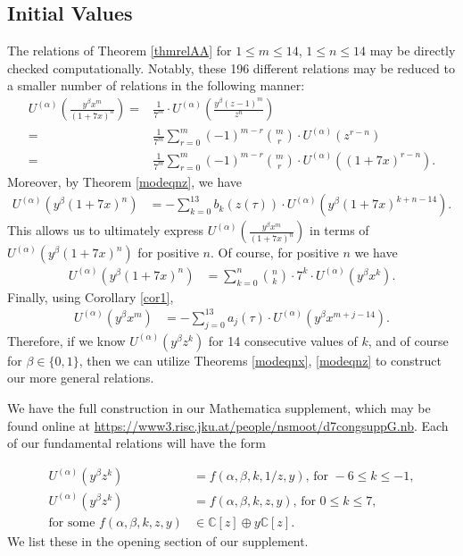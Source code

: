 \documentclass[reqno]{amsart}
\theoremstyle{definition}
\theoremstyle{remark}
\numberwithin{equation}{section}
\begin{document}
\subsection{Initial Values}\label{sectioninitialetc}

The relations of Theorem \ref{thmrelAA} for $1\le m\le 14$, $1\le n\le 14$ may be directly checked computationally.  Notably, these 196 different relations may be reduced to a smaller number of relations in the following manner:
\begin{align*}
U^{(\alpha)}\left( \frac{y^{\beta}x^{m}}{(1+7x)^{n}} \right) =& \frac{1}{7^m}\cdot U^{(\alpha)}\left( \frac{y^{\beta}(z-1)^{m}}{z^{n}} \right)\\
=& \frac{1}{7^m}\sum_{r=0}^{m}(-1)^{m-r}{{m}\choose{r}}\cdot U^{(\alpha)}\left( z^{r-n} \right)\\
=& \frac{1}{7^m}\sum_{r=0}^{m}(-1)^{m-r}{{m}\choose{r}}\cdot U^{(\alpha)}\left( (1+7x)^{r-n} \right).
\end{align*}  Moreover, by Theorem \ref{modeqnz}, we have
\begin{align*}
U^{(\alpha)}\left( y^{\beta}(1+7x)^n \right) &= -\sum_{k=0}^{13} b_k(z(\tau))\cdot U^{(\alpha)}\left( y^{\beta}(1+7x)^{k+n-14} \right).
\end{align*}  This allows us to ultimately express $U^{(\alpha)}\left( \frac{y^{\beta}x^{m}}{(1+7x)^{n}} \right)$ in terms of $U^{(\alpha)}\left( y^{\beta}(1+7x)^{n} \right)$ for positive $n$.  Of course, for positive $n$ we have
\begin{align*}
U^{(\alpha)}\left( y^{\beta}(1+7x)^n \right) &= \sum_{k=0}^n {{n}\choose{k}}\cdot 7^k\cdot U^{(\alpha)}\left( y^{\beta}x^k \right).
\end{align*}  Finally, using Corollary \ref{cor1},
\begin{align*}
U^{(\alpha)}\left( y^{\beta}x^m \right) &= -\sum_{j=0}^{13} a_j(\tau)\cdot U^{(\alpha)}\left( y^{\beta}x^{m+j-14} \right).
\end{align*}  Therefore, if we know $U^{(\alpha)}\left( y^{\beta}z^k \right)$ for 14 consecutive values of $k$, and of course for $\beta\in\{0,1\}$, then we can utilize Theorems \ref{modeqnx}, \ref{modeqnz} to construct our more general relations.

We have the full construction in our Mathematica supplement, which may be found online at \url{https://www3.risc.jku.at/people/nsmoot/d7congsuppG.nb}.  Each of our fundamental relations will have the form

\begin{align}
U^{(\alpha)}\left( y^{\beta}z^k \right) &= f(\alpha,\beta,k,1/z,y)\text{, for } -6\le k\le -1,\label{initialuaybxketc}\\
U^{(\alpha)}\left( y^{\beta}z^k \right) &= f(\alpha,\beta,k,z,y)\text{, for } 0\le k\le 7,\label{initialuaybxkaetc}\\
\text{for some }f(\alpha,\beta,k,z,y)&\in\mathbb{C}[z]\oplus y\mathbb{C}[z].\label{fdefnetc}
\end{align}  We list these in the opening section of our supplement.
\end{document}
